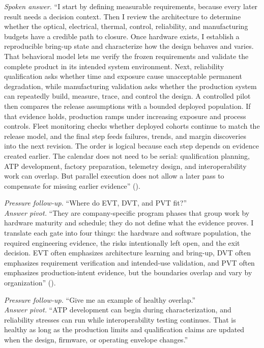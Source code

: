 \textit{Spoken answer.}
``I start by defining measurable requirements, because every later result needs
a decision context. Then I review the architecture to determine whether the
optical, electrical, thermal, control, reliability, and manufacturing budgets
have a credible path to closure. Once hardware exists, I establish a
reproducible bring-up state and characterize how the design behaves and varies.
That behavioral model lets me verify the frozen requirements and validate the
complete product in its intended system environment. Next, reliability
qualification asks whether time and exposure cause unacceptable permanent
degradation, while manufacturing validation asks whether the production system
can repeatedly build, measure, trace, and control the design. A controlled
pilot then compares the release assumptions with a bounded deployed population.
If that evidence holds, production ramps under increasing exposure and process
controls. Fleet monitoring checks whether deployed cohorts continue to match
the release model, and the final step feeds failures, trends, and margin
discoveries into the next revision. The order is logical because each step
depends on evidence created earlier. The calendar does not need to be serial:
qualification planning, ATP development, factory preparation, telemetry design,
and interoperability work can overlap. But parallel execution does not allow a
later pass to compensate for missing earlier evidence''
().

\textit{Pressure follow-up.} ``Where do EVT, DVT, and PVT fit?''\\
\textit{Answer pivot.} ``They are company-specific program phases that group
work by hardware maturity and schedule; they do not define what the evidence
proves. I translate each gate into four things: the hardware and software
population, the required engineering evidence, the risks intentionally left
open, and the exit decision. EVT often emphasizes architecture learning and
bring-up, DVT often emphasizes requirement verification and intended-use
validation, and PVT often emphasizes production-intent evidence, but the
boundaries overlap and vary by organization''
().

\textit{Pressure follow-up.} ``Give me an example of healthy overlap.''\\
\textit{Answer pivot.} ``ATP development can begin during characterization, and
reliability stresses can run while interoperability testing continues. That is
healthy as long as the production limits and qualification claims are updated
when the design, firmware, or operating envelope changes.''

